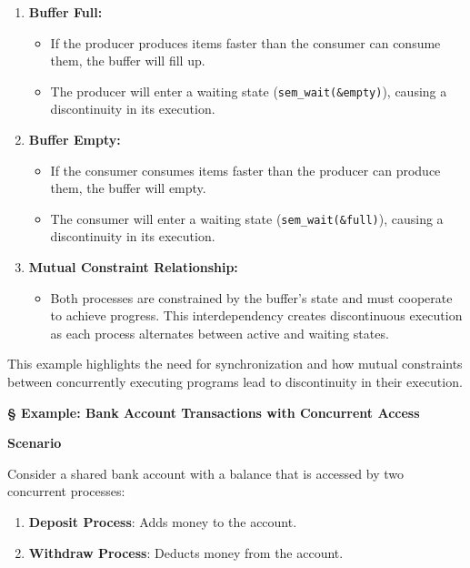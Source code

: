 \documentclass[a4paper]{book}
\newcommand{\sfbf}[1]{{\normalsize\textsf{\textbf{§ #1}}}}
\begin{document}
\begin{enumerate}
\item 
\textbf{Buffer Full:}
\begin{itemize}
\item 
If the producer produces items faster than the consumer can consume them, the buffer will fill up.

\item 
The producer will enter a waiting state (\verb|sem_wait(&empty)|), causing a discontinuity in its execution.

\end{itemize}

\item 
\textbf{Buffer Empty:}
\begin{itemize}
\item 
If the consumer consumes items faster than the producer can produce them, the buffer will empty.

\item 
The consumer will enter a waiting state (\verb|sem_wait(&full)|), causing a discontinuity in its execution.

\end{itemize}

\item 
\textbf{Mutual Constraint Relationship:}
\begin{itemize}
\item 
Both processes are constrained by the buffer’s state and must cooperate to achieve progress. This interdependency creates discontinuous execution as each process alternates between active and waiting states.

\end{itemize}

\end{enumerate}

This example highlights the need for synchronization and how mutual constraints between concurrently executing programs lead to discontinuity in their execution.

\sfbf{Example: Bank Account Transactions with Concurrent Access}

\textbf{Scenario}

Consider a shared bank account with a balance that is accessed by two concurrent processes:
\begin{enumerate}
\item 
\textbf{Deposit Process}: Adds money to the account.

\item 
\textbf{Withdraw Process}: Deducts money from the account.

\end{enumerate}
\end{document}

